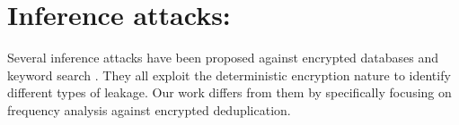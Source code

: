 
\section{Inference attacks:}  Several inference attacks have been proposed
against encrypted databases
\cite{grubbs17,bindschaedler17,kellaris16,durak16,naveed15,lacharite18} and 
keyword search \cite{zhang16b,grubbs16,pouliot16,cash15,islam12}.  They all
exploit the deterministic encryption nature to identify different types of
leakage.  Our work differs from them by specifically focusing on frequency analysis against encrypted
deduplication. 

%



